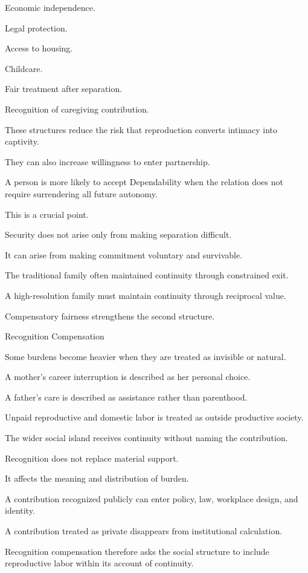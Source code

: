 Economic independence.

Legal protection.

Access to housing.

Childcare.

Fair treatment after separation.

Recognition of caregiving contribution.

These structures reduce the risk that reproduction converts intimacy into captivity.

They can also increase willingness to enter partnership.

A person is more likely to accept Dependability when the relation does not require surrendering all future autonomy.

This is a crucial point.

Security does not arise only from making separation difficult.

It can arise from making commitment voluntary and survivable.

The traditional family often maintained continuity through constrained exit.

A high-resolution family must maintain continuity through reciprocal value.

Compensatory fairness strengthens the second structure.

Recognition Compensation

Some burdens become heavier when they are treated as invisible or natural.

A mother’s career interruption is described as her personal choice.

A father’s care is described as assistance rather than parenthood.

Unpaid reproductive and domestic labor is treated as outside productive society.

The wider social island receives continuity without naming the contribution.

Recognition does not replace material support.

It affects the meaning and distribution of burden.

A contribution recognized publicly can enter policy, law, workplace design, and identity.

A contribution treated as private disappears from institutional calculation.

Recognition compensation therefore asks the social structure to include reproductive labor within its account of continuity.

